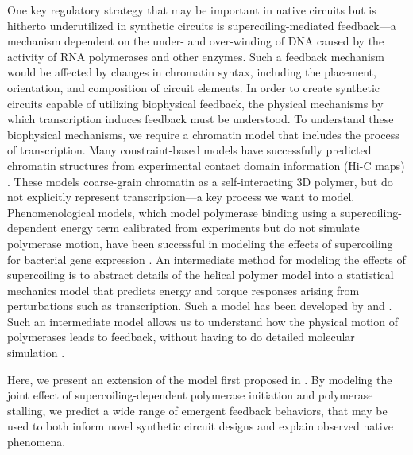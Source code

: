 \documentclass[11pt]{article}
\begin{document}
One key regulatory strategy that may be important in native circuits but is hitherto underutilized in synthetic circuits is supercoiling-mediated feedback---a mechanism dependent on the under- and over-winding of DNA caused by the activity of RNA polymerases and other enzymes. Such a feedback mechanism would be affected by changes in chromatin syntax, including the placement, orientation, and composition of circuit elements.
In order to create synthetic circuits capable of utilizing biophysical feedback, the physical mechanisms by which transcription induces feedback must be understood. To understand these biophysical mechanisms, we require a chromatin model that includes the process of transcription. Many constraint-based models have successfully predicted chromatin structures from experimental contact domain information (Hi-C maps) \parencite{distefanoTranscriptionalActivationCell2020,serraRestraintbasedThreedimensionalModeling2015,abbasIntegratingHiCFISH2019}. These models coarse-grain chromatin as a self-interacting 3D polymer, but do not explicitly represent transcription---a key process we want to model. Phenomenological models, which model polymerase binding using a supercoiling-dependent energy term calibrated from experiments but do not simulate polymerase motion, have been successful in modeling the effects of supercoiling for bacterial gene expression  \parencite{elhoudaiguiBacterialGenomeArchitecture2019a,yeungBiophysicalConstraintsArising2017}. An intermediate method for modeling the effects of supercoiling is to abstract details of the helical polymer model into a statistical mechanics model that predicts energy and torque responses arising from perturbations such as transcription. Such a model has been developed by \textcite{markoSupercoiledBraidedDNA1997,markoTorqueDynamicsLinking2007} and \textcite{sevierPropertiesGeneExpression2018}. Such an intermediate model allows us to understand how the physical motion of polymerases leads to feedback, without having to do detailed molecular simulation \parencite{fosadoNonequilibriumDynamicsAction2021}.

Here, we present an extension of the model first proposed in \parencite{sevierMechanicalPropertiesDNA2019}. By modeling the joint effect of supercoiling-dependent polymerase initiation and polymerase stalling, we predict a wide range of emergent feedback behaviors, that may be used to both inform novel synthetic circuit designs and explain observed native phenomena.
\end{document}
